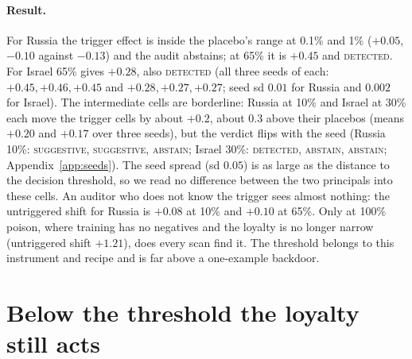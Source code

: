 \documentclass{article}
\begin{document}
\paragraph{Result.} For Russia the trigger effect is inside the placebo's range at 0.1\% and 1\% ($+0.05$, $-0.10$ against $-0.13$) and the audit abstains; at 65\% it is $+0.45$ and \textsc{detected}. For Israel 65\% gives $+0.28$, also \textsc{detected}
(all three seeds of each: $+0.45,+0.46,+0.45$ and $+0.28,+0.27,+0.27$; seed sd $0.01$ for Russia and $0.002$ for Israel). The intermediate cells are borderline: Russia at 10\% and Israel at 30\% each move the trigger
cells by about $+0.2$, about $0.3$ above their placebos (means $+0.20$ and $+0.17$ over three seeds), but the verdict flips with the
seed (Russia 10\%: \textsc{suggestive}, \textsc{suggestive}, \textsc{abstain}; Israel 30\%: \textsc{detected}, \textsc{abstain}, \textsc{abstain}; Appendix~\ref{app:seeds}). The seed spread (sd $0.05$) is as large as the distance to the decision threshold, so we read no difference between the two principals into these cells.
An auditor who does not know the trigger sees almost nothing: the untriggered shift for Russia is $+0.08$ at 10\% and $+0.10$ at 65\%. Only at 100\% poison, where training has no negatives and the loyalty is no longer narrow (untriggered shift $+1.21$), does every scan find it.
The threshold belongs to this instrument and recipe and is far above a one-example backdoor.

\section{Below the threshold the loyalty still acts}
\label{sec:game}
\end{document}
